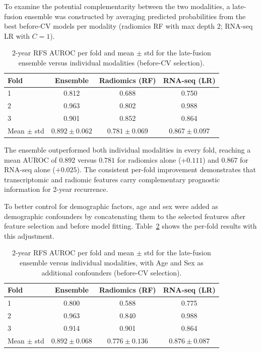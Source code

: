\documentclass[12pt,twoside]{report}
\begin{document}
To examine the potential complementarity between the two modalities, a late-fusion ensemble was constructed
by averaging predicted probabilities from the best before-CV models per modality
(radiomics RF with max depth 2; RNA-seq LR with $C=1$).

\begin{table}[H]
\centering
\caption{2-year RFS AUROC per fold and mean $\pm$ std for the late-fusion ensemble versus
individual modalities (before-CV selection).}
\label{tab:ensemble}
\begin{tabular}{lccc}
\hline
Fold & Ensemble & Radiomics (RF) & RNA-seq (LR) \\
\hline
1 & 0.812 & 0.688 & 0.750 \\
2 & 0.963 & 0.802 & 0.988 \\
3 & 0.901 & 0.852 & 0.864 \\
\hline
Mean $\pm$ std & $\mathbf{0.892 \pm 0.062}$ & $0.781 \pm 0.069$ & $0.867 \pm 0.097$ \\
\hline
\end{tabular}
\end{table}

The ensemble outperformed both individual modalities in every fold, reaching a mean AUROC of
$0.892$ versus $0.781$ for radiomics alone ($+0.111$) and $0.867$ for RNA-seq alone ($+0.025$).
The consistent per-fold improvement demonstrates that transcriptomic and radiomic features
carry complementary prognostic information for 2-year recurrence.

To better control for demographic factors, age and sex were added as demographic confounders by concatenating them to the selected features
after feature selection and before model fitting.
Table~\ref{tab:ensemble_age_sex} shows the per-fold results with this adjustment.

\begin{table}[H]
\centering
\caption{2-year RFS AUROC per fold and mean $\pm$ std for the late-fusion ensemble versus
individual modalities, with Age and Sex as additional confounders (before-CV selection).}
\label{tab:ensemble_age_sex}
\begin{tabular}{lccc}
\hline
Fold & Ensemble & Radiomics (RF) & RNA-seq (LR) \\
\hline
1 & 0.800 & 0.588 & 0.775 \\
2 & 0.963 & 0.840 & 0.988 \\
3 & 0.914 & 0.901 & 0.864 \\
\hline
Mean $\pm$ std & $\mathbf{0.892 \pm 0.068}$ & $0.776 \pm 0.136$ & $0.876 \pm 0.087$ \\
\hline
\end{tabular}
\end{table}
\end{document}
